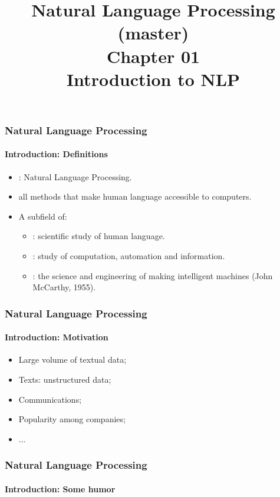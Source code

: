 \documentclass[xcolor=table]{beamer}
\title[ESI - NLP(master): 01- Introduction]%
{Natural Language Processing (master)\\Chapter 01\\Introduction to NLP}
\begin{document}
	
\begin{frame}
\frametitle{Natural Language Processing}
\framesubtitle{Introduction: Definitions}

\begin{itemize}
	\item {}: Natural Language Processing.
	\item all methods that make human language accessible to computers.
\end{itemize}
\begin{minipage}{0.78\textwidth}
\begin{itemize}
	\item A subfield of:
	\begin{itemize}
		\item {}: scientific study of human language.
		\item {}: study of computation, automation and information.
		\item {}: the science and engineering of
		making intelligent machines (John McCarthy, 1955).
	\end{itemize}
\end{itemize}
\end{minipage}
\begin{minipage}{0.20\textwidth}
\end{minipage}
\end{frame}

\begin{frame}
\frametitle{Natural Language Processing}
\framesubtitle{Introduction: Motivation}

\begin{itemize}
	\item Large volume of textual data;
	
	\item Texts: unstructured data;
	
	\item Communications;
	
	\item Popularity among companies;
	
	\item ...
\end{itemize}

\end{frame}

\begin{frame}
\frametitle{Natural Language Processing}
\framesubtitle{Introduction: Some humor}

\begin{center}
\end{center}

\end{frame}
\end{document}
